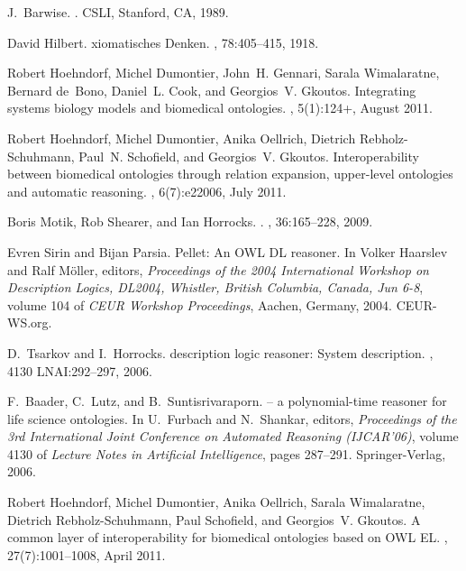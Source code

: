 \documentclass[11pt]{article}
\begin{document}
\begin{thebibliography}{10}
J.~Barwise.
.
\newblock CSLI, Stanford, CA, 1989.

David Hilbert.
xiomatisches {D}enken.
, 78:405--415, 1918.

Robert Hoehndorf, Michel Dumontier, John~H. Gennari, Sarala Wimalaratne,
  Bernard de~Bono, Daniel~L. Cook, and Georgios~V. Gkoutos.
\newblock Integrating systems biology models and biomedical ontologies.
, 5(1):124+, August 2011.

Robert Hoehndorf, Michel Dumontier, Anika Oellrich, Dietrich Rebholz-Schuhmann,
  Paul~N. Schofield, and Georgios~V. Gkoutos.
\newblock Interoperability between biomedical ontologies through relation
  expansion, upper-level ontologies and automatic reasoning.
, 6(7):e22006, July 2011.

Boris Motik, Rob Shearer, and Ian Horrocks.
.
, 36:165--228, 2009.

Evren Sirin and Bijan Parsia.
\newblock Pellet: An {OWL} {DL} reasoner.
\newblock In Volker Haarslev and Ralf M{\"{o}}ller, editors, {\em Proceedings
  of the 2004 International Workshop on Description Logics, DL2004, Whistler,
  British Columbia, Canada, Jun 6-8}, volume 104 of {\em CEUR Workshop
  Proceedings}, Aachen, Germany, 2004. CEUR-WS.org.

D.~Tsarkov and I.~Horrocks.
 description logic reasoner: System description.
, 4130
  LNAI:292--297, 2006.

F.~Baader, C.~Lutz, and B.~Suntisrivaraporn.
 -- a polynomial-time reasoner for life science ontologies.
\newblock In U.~Furbach and N.~Shankar, editors, {\em Proceedings of the 3rd
  International Joint Conference on Automated Reasoning ({IJCAR'06})}, volume
  4130 of {\em Lecture Notes in Artificial Intelligence}, pages 287--291.
  Springer-Verlag, 2006.

Robert Hoehndorf, Michel Dumontier, Anika Oellrich, Sarala Wimalaratne,
  Dietrich Rebholz-Schuhmann, Paul Schofield, and Georgios~V. Gkoutos.
\newblock A common layer of interoperability for biomedical ontologies based on
  {OWL} {EL}.
, 27(7):1001--1008, April 2011.


\end{thebibliography}
\end{document}
